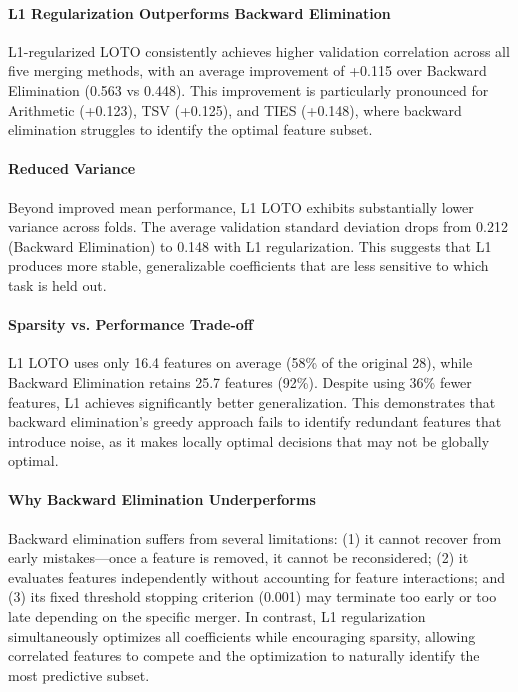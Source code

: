\paragraph{L1 Regularization Outperforms Backward Elimination}
L1-regularized LOTO consistently achieves higher validation correlation across all five merging methods, with an average improvement of +0.115 over Backward Elimination (0.563 vs 0.448). This improvement is particularly pronounced for Arithmetic (+0.123), TSV (+0.125), and TIES (+0.148), where backward elimination struggles to identify the optimal feature subset.

\paragraph{Reduced Variance}
Beyond improved mean performance, L1 LOTO exhibits substantially lower variance across folds. The average validation standard deviation drops from 0.212 (Backward Elimination) to 0.148 with L1 regularization. This suggests that L1 produces more stable, generalizable coefficients that are less sensitive to which task is held out.

\paragraph{Sparsity vs. Performance Trade-off}
L1 LOTO uses only 16.4 features on average (58\% of the original 28), while Backward Elimination retains 25.7 features (92\%). Despite using 36\% fewer features, L1 achieves significantly better generalization. This demonstrates that backward elimination's greedy approach fails to identify redundant features that introduce noise, as it makes locally optimal decisions that may not be globally optimal.

\paragraph{Why Backward Elimination Underperforms}
Backward elimination suffers from several limitations: (1) it cannot recover from early mistakes---once a feature is removed, it cannot be reconsidered; (2) it evaluates features independently without accounting for feature interactions; and (3) its fixed threshold stopping criterion (0.001) may terminate too early or too late depending on the specific merger. In contrast, L1 regularization simultaneously optimizes all coefficients while encouraging sparsity, allowing correlated features to compete and the optimization to naturally identify the most predictive subset.

